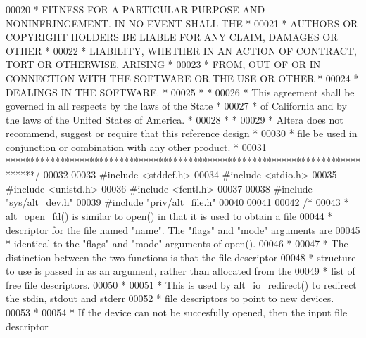 \begin{DoxyCode}
00020 \textcolor{comment}{* FITNESS FOR A PARTICULAR PURPOSE AND NONINFRINGEMENT. IN NO EVENT SHALL THE *}
00021 \textcolor{comment}{* AUTHORS OR COPYRIGHT HOLDERS BE LIABLE FOR ANY CLAIM, DAMAGES OR OTHER      *}
00022 \textcolor{comment}{* LIABILITY, WHETHER IN AN ACTION OF CONTRACT, TORT OR OTHERWISE, ARISING     *}
00023 \textcolor{comment}{* FROM, OUT OF OR IN CONNECTION WITH THE SOFTWARE OR THE USE OR OTHER         *}
00024 \textcolor{comment}{* DEALINGS IN THE SOFTWARE.                                                   *}
00025 \textcolor{comment}{*                                                                             *}
00026 \textcolor{comment}{* This agreement shall be governed in all respects by the laws of the State   *}
00027 \textcolor{comment}{* of California and by the laws of the United States of America.              *}
00028 \textcolor{comment}{*                                                                             *}
00029 \textcolor{comment}{* Altera does not recommend, suggest or require that this reference design    *}
00030 \textcolor{comment}{* file be used in conjunction or combination with any other product.          *}
00031 \textcolor{comment}{******************************************************************************/}
00032 
00033 \textcolor{preprocessor}{#include <stddef.h>}
00034 \textcolor{preprocessor}{#include <stdio.h>}
00035 \textcolor{preprocessor}{#include <unistd.h>}
00036 \textcolor{preprocessor}{#include <fcntl.h>}
00037 
00038 \textcolor{preprocessor}{#include "sys/alt_dev.h"}
00039 \textcolor{preprocessor}{#include "priv/alt_file.h"}
00040 
00041 
00042 \textcolor{comment}{/*}
00043 \textcolor{comment}{ * alt\_open\_fd() is similar to open() in that it is used to obtain a file}
00044 \textcolor{comment}{ * descriptor for the file named "name". The "flags" and "mode" arguments are}
00045 \textcolor{comment}{ * identical to the "flags" and "mode" arguments of open().}
00046 \textcolor{comment}{ *}
00047 \textcolor{comment}{ * The distinction between the two functions is that the file descriptor }
00048 \textcolor{comment}{ * structure to use is passed in as an argument, rather than allocated from the}
00049 \textcolor{comment}{ * list of free file descriptors.}
00050 \textcolor{comment}{ *}
00051 \textcolor{comment}{ * This is used by alt\_io\_redirect() to redirect the stdin, stdout and stderr}
00052 \textcolor{comment}{ * file descriptors to point to new devices.}
00053 \textcolor{comment}{ *}
00054 \textcolor{comment}{ * If the device can not be succesfully opened, then the input file descriptor}

\end{DoxyCode}
